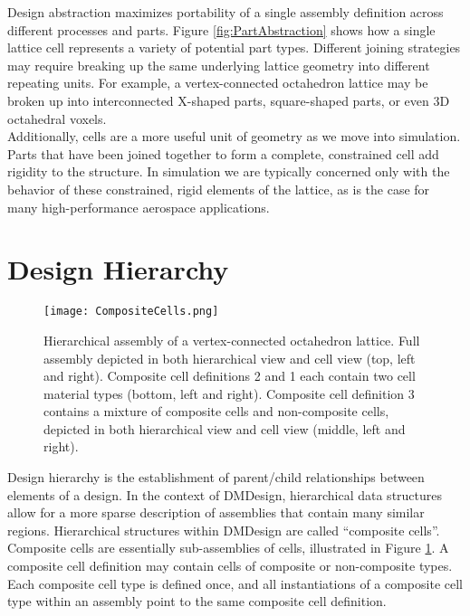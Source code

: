 {Design abstraction maximizes portability of a single assembly definition across different processes and parts.  Figure \ref{fig:PartAbstraction} shows how a single lattice cell represents a variety of potential part types.  Different joining strategies may require breaking up the same underlying lattice geometry into different repeating units.  For example, a vertex-connected octahedron lattice may be broken up into interconnected X-shaped parts, square-shaped parts, or even 3D octahedral voxels.\\ 

Additionally, cells are a more useful unit of geometry as we move into simulation.  Parts that have been joined together to form a complete, constrained cell add rigidity to the structure.  In simulation we are typically concerned only with the behavior of these constrained, rigid elements of the lattice, as is the case for many high-performance aerospace applications.

\section{Design Hierarchy}

\begin{figure}
  \texttt{[image: CompositeCells.png]}
  \caption{Hierarchical assembly of a vertex-connected octahedron lattice.  Full assembly depicted in both hierarchical view and cell view (top, left and right).  Composite cell definitions 2 and 1 each contain two cell material types (bottom, left and right).  Composite cell definition 3 contains a mixture of composite cells and non-composite cells, depicted in both hierarchical view and cell view (middle, left and right).}
  \label{fig:CompositeCells}
\end{figure}

Design hierarchy is the establishment of parent/child relationships between elements of a design.  In the context of DMDesign, hierarchical data structures allow for a more sparse description of assemblies that contain many similar regions.  Hierarchical structures within DMDesign are called ``composite cells''.\\

Composite cells are essentially sub-assemblies of cells, illustrated in Figure \ref{fig:CompositeCells}.  A composite cell definition may contain cells of composite or non-composite types.  Each composite cell type is defined once, and all instantiations of a composite cell type within an assembly point to the same composite cell definition.\\

}
